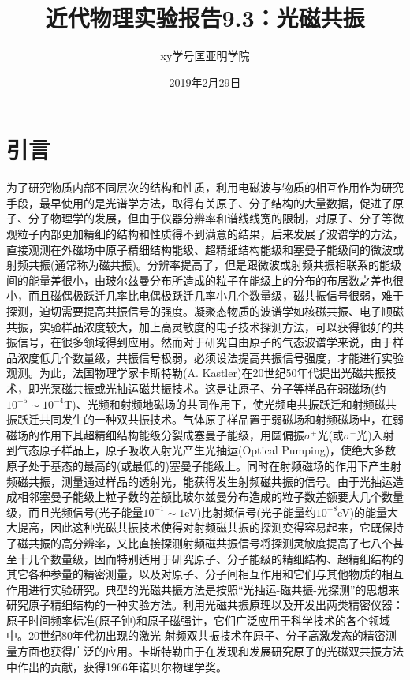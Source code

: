 \documentclass[a4paper]{article}
\title{近代物理实验报告9.3：光磁共振}
\author{xy\quad 学号\quad 匡亚明学院}
\date{2019年2月29日}
\begin{document}
\maketitle


\section{引言}
为了研究物质内部不同层次的结构和性质，利用电磁波与物质的相互作用作为研究手段，最早使用的是光谱学方法，取得有关原子、分子结构的大量数据，促进了原子、分子物理学的发展，但由于仪器分辨率和谱线线宽的限制，对原子、分子等微观粒子内部更加精细的结构和性质得不到满意的结果，后来发展了波谱学的方法，直接观测在外磁场中原子精细结构能级、超精细结构能级和塞曼子能级间的微波或射频共振(通常称为磁共振)。分辨率提高了，但是跟微波或射频共振相联系的能级间的能量差很小，由玻尔兹曼分布所造成的粒子在能级上的分布的布居数之差也很小，而且磁偶极跃迁几率比电偶极跃迁几率小几个数量级，磁共振信号很弱，难于探测，迫切需要提高共振信号的强度。凝聚态物质的波谱学如核磁共振、电子顺磁共振，实验样品浓度较大，加上高灵敏度的电子技术探测方法，可以获得很好的共振信号，在很多领域得到应用。然而对于研究自由原子的气态波谱学来说，由于样品浓度低几个数量级，共振信号极弱，必须设法提高共振信号强度，才能进行实验观测。为此，法国物理学家卡斯特勒(A. Kastler)在20世纪50年代提出光磁共振技术，即光泵磁共振或光抽运磁共振技术。这是让原子、分子等样品在弱磁场(约$10^{-5}\sim 10^{-4}$T)、光频和射频地磁场的共同作用下，使光频电共振跃迁和射频磁共振跃迁共同发生的一种双共振技术。气体原子样品置于弱磁场和射频磁场中，在弱磁场的作用下其超精细结构能级分裂成塞曼子能级，用圆偏振$\sigma^{+}$光(或$\sigma^{-}$光)入射到气态原子样品上，原子吸收入射光产生光抽运(Optical Pumping)，使绝大多数原子处于基态的最高的(或最低的)塞曼子能级上。同时在射频磁场的作用下产生射频磁共振，测量通过样品的透射光，能获得发生射频磁共振的信号。由于光抽运造成相邻塞曼子能级上粒子数的差额比玻尔兹曼分布造成的粒子数差额要大几个数量级，而且光频信号(光子能量$10^{-1}\sim 1$eV)比射频信号(光子能量约$10^{-8}$eV)的能量大大提高，因此这种光磁共振技术使得对射频磁共振的探测变得容易起来，它既保持了磁共振的高分辨率，又比直接探测射频磁共振信号将探测灵敏度提高了七八个甚至十几个数量级，因而特别适用于研究原子、分子能级的精细结构、超精细结构的其它各种参量的精密测量，以及对原子、分子间相互作用和它们与其他物质的相互作用进行实验研究。典型的光磁共振方法是按照“光抽运-磁共振-光探测”的思想来研究原子精细结构的一种实验方法。利用光磁共振原理以及开发出两类精密仪器：原子时间频率标准(原子钟)和原子磁强计，它们广泛应用于科学技术的各个领域中。20世纪80年代初出现的激光-射频双共振技术在原子、分子高激发态的精密测量方面也获得广泛的应用。卡斯特勒由于在发现和发展研究原子的光磁双共振方法中作出的贡献，获得1966年诺贝尔物理学奖。
\end{document}
